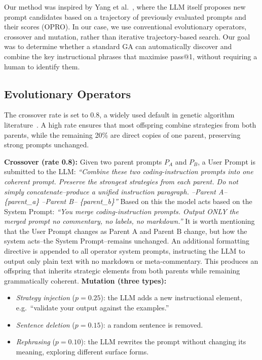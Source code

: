 \documentclass[conference]{IEEEtran}
\begin{document}
Our method was inspired by Yang et al.~\cite{yang2024opro}, where the LLM itself proposes
new prompt candidates based on a trajectory of previously evaluated prompts and their scores
(OPRO). In our case, we use conventional evolutionary operators, crossover and mutation, 
rather than iterative trajectory-based search. Our goal was to determine whether a standard
GA can automatically discover and combine the key instructional phrases that maximise
pass@1, without requiring a human to identify them.

\subsection{Evolutionary Operators}
The crossover rate is set to 0.8, a widely used default in genetic algorithm literature~\cite{dejong1975, goldberg1989}. A high rate ensures that most offspring combine strategies from both parents, while the remaining 20\% are direct copies of one parent, preserving strong prompts unchanged.

\textbf{Crossover (rate 0.8):} Given two parent prompts $P_A$ and $P_B$, a User Prompt is
submitted to the LLM: \textit{``Combine these two coding-instruction prompts into one coherent prompt.
Preserve the strongest strategies from each parent.
Do not simply concatenate--produce a unified instruction paragraph.
--Parent A--
\{parent\_a\}
--Parent B--
\{parent\_b\}''} Based on this the model acts based on the System Prompt: \textit{``You merge
coding-instruction prompts. Output ONLY the merged prompt no commentary, no labels, no
markdown.''} It is worth mentioning that the User Prompt changes as Parent A and Parent B
change, but how the system acts--the System Prompt--remains unchanged.
An additional formatting directive is appended to all operator system prompts,
instructing the LLM to output only plain text with no markdown or meta-commentary.
This produces an offspring that inherits strategic elements from both
parents while remaining grammatically coherent.
\textbf{Mutation (three types):}
\begin{itemize}
    \item \textit{Strategy injection} ($p = 0.25$): the LLM adds a new instructional
    element, e.g.\ ``validate your output against the examples.''
    \item \textit{Sentence deletion} ($p = 0.15$): a random sentence is removed.
    \item \textit{Rephrasing} ($p = 0.10$): the LLM rewrites the prompt without changing
    its meaning, exploring different surface forms.
\end{itemize}
\end{document}
